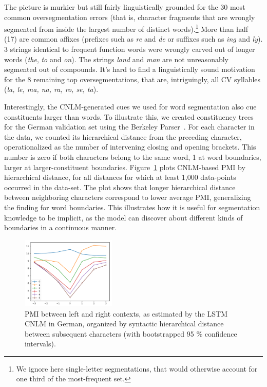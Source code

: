 The picture is murkier but still fairly linguistically grounded
for the 30 most common oversegmentation errors (that is, character
fragments that are wrongly segmented from inside the largest number of
distinct words).\footnote{We ignore here single-letter segmentations,
  that would otherwise account for one third of the most-frequent
  set.}  More than half (17) are common affixes (prefixes such as
\emph{re} and \emph{de} or suffixes such as \emph{ing} and
\emph{ly}). 3 strings identical to frequent
function words were wrongly carved out of longer words (\emph{the},
\emph{to} and \emph{on}). %
The strings \emph{land} and \emph{man} are not unreasonably segmented
out of compounds. It's hard to find a linguistically sound motivation
for the 8 remaining top oversegmentations, that are, intriguingly, all CV
syllables (\emph{la, le, ma, na, ra, ro, se, ta}).


Interestingly, the CNLM-generated cues we used for word segmentation
also cue constituents larger than words. To illustrate this, we created constituency trees for the German
validation set using the Berkeley Parser~\cite{petrov2007improved}.
For each character in the data, we counted its hierarchical distance
from the preceding character, operationalized as the number of
intervening closing and opening brackets.  This number is zero if both characters belong to the same word, 1 at word
boundaries, larger at larger-constituent boundaries. Figure~\ref{fig:syntax-depth} plots CNLM-based PMI by
hierarchical distance, for all distances for which at least 1,000
data-points occurred in the data-set.  The plot shows that longer
hierarchical distance between neighboring characters correspond to
lower average PMI, generalizing the finding for word boundaries.  This
illustrates how it is useful for segmentation knowledge to be
implicit, as the model can discover about different kinds of
boundaries in a continuous manner.

\begin{figure}
  \center
\includegraphics[width=0.4\textwidth]{figures/segmentation-profile-pmis-german-all-heights-ci.pdf}
\caption{PMI between left and right contexts, as estimated by the LSTM CNLM in German, organized by syntactic hierarchical distance between subsequent characters (with bootstrapped 95 \% confidence intervals).}\label{fig:syntax-depth}
\end{figure}





